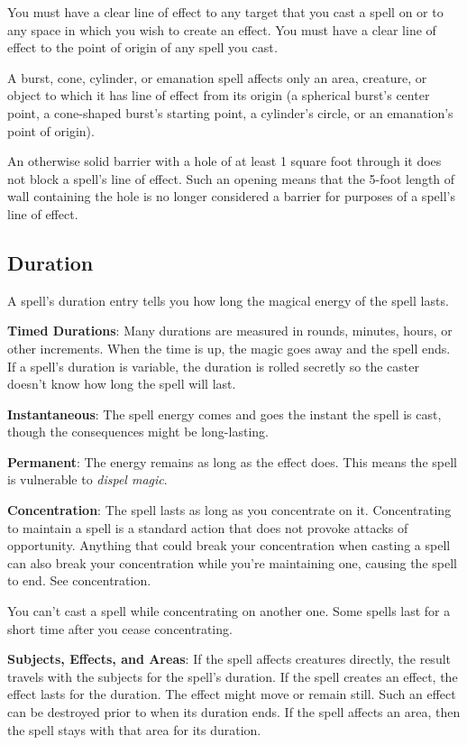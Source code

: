 You must have a clear line of effect to any target that you cast a spell on or to any space in which you wish to create an effect. You must have a clear line of effect to the point of origin of any spell you cast\textit{.}
				
A burst, cone, cylinder, or emanation spell affects only an area, creature, or object to which it has line of effect from its origin (a spherical burst's center point, a cone-shaped burst's starting point, a cylinder's circle, or an emanation's point of origin).
				
An otherwise solid barrier with a hole of at least 1 square foot through it does not block a spell's line of effect. Such an opening means that the 5-foot length of wall containing the hole is no longer considered a barrier for purposes of a spell's line of effect.
				
\subsection{Duration}

				
A spell's duration entry tells you how long the magical energy of the spell lasts.
				
\textbf{Timed Durations}: Many durations are measured in rounds, minutes, hours, or other increments. When the time is up, the magic goes away and the spell ends. If a spell's duration is variable, the duration is rolled secretly so the caster doesn't know how long the spell will last. 
				
\textbf{Instantaneous}: The spell energy comes and goes the instant the spell is cast, though the consequences might be long-lasting.
				
\textbf{Permanent}: The energy remains as long as the effect does. This means the spell is vulnerable to \textit{dispel magic}. 
				
\textbf{Concentration}: The spell lasts as long as you concentrate on it. Concentrating to maintain a spell is a standard action that does not provoke attacks of opportunity. Anything that could break your concentration when casting a spell can also break your concentration while you're maintaining one, causing the spell to end. See concentration.
				
You can't cast a spell while concentrating on another one. Some spells last for a short time after you cease concentrating.
				
\textbf{Subjects, Effects, and Areas}: If the spell affects creatures directly, the result travels with the subjects for the spell's duration. If the spell creates an effect, the effect lasts for the duration. The effect might move or remain still. Such an effect can be destroyed prior to when its duration ends. If the spell affects an area, then the spell stays with that area for its duration. 
				
